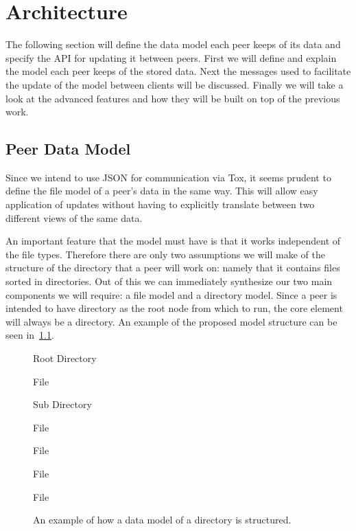 \chapter{Architecture}
\label{chap:architecture}

The following section will define the data model each peer keeps of its data and specify the API for updating it between peers.
First we will define and explain the model each peer keeps of the stored data.
Next the messages used to facilitate the update of the model between clients will be discussed.
Finally we will take a look at the advanced features and how they will be built on top of the previous work.

\section{Peer Data Model}
\label{sec:Peer Data Model}

Since we intend to use JSON for communication via Tox, it seems prudent to define the file model of a peer's data in the same way.
This will allow easy application of updates without having to explicitly translate between two different views of the same data.

An important feature that the model must have is that it works independent of the file types.
Therefore there are only two assumptions we will make of the structure of the directory that a peer will work on: namely that it contains files sorted in directories.
Out of this we can immediately synthesize our two main components we will require: a file model and a directory model.
Since a peer is intended to have directory as the root node from which to run, the core element will always be a directory.
An example of the proposed model structure can be seen in~\ref{list:model}.

\begin{figure}[htp]
\begin{modellist}
\item Root Directory
    \begin{modellist}
        \item File
        \item Sub Directory
            \begin{modellist}
                \item File
                \item File
            \end{modellist}
        \item File
        \item File
    \end{modellist}
\end{modellist}
\caption[Data Model Example Structure]{An example of how a data model of a directory is structured.}
\label{list:model}
\end{figure}

